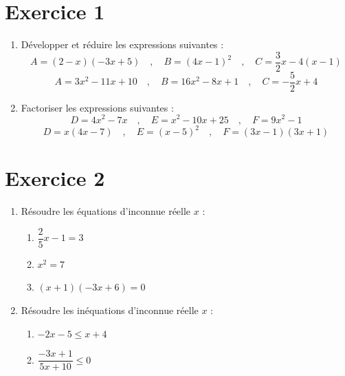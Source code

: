 \documentclass[12pt]{article}
\begin{document}
\section*{Exercice 1}

\begin{enumerate}
    \item Développer et réduire les expressions suivantes :
    \[
    A = (2 - x)(-3x + 5) \quad , \quad B = (4x - 1)^2 \quad , \quad C = \dfrac{3}{2}x - 4(x - 1)
    \]
    {\color{red}
    \[
    A = \boxed{3x^2 - 11x + 10} \quad , \quad B = \boxed{16x^2 - 8x + 1} \quad , \quad C = \boxed{-\dfrac{5}{2}x + 4}
    \]}

    \item Factoriser les expressions suivantes :
    \[
    D = 4x^2 - 7x \quad , \quad E = x^2 - 10x + 25 \quad , \quad F = 9x^2 - 1
    \]
    {\color{red}
    \[
    D = \boxed{x(4x - 7)} \quad , \quad E = \boxed{(x - 5)^2} \quad , \quad F = \boxed{(3x - 1)(3x + 1)}
    \]}
\end{enumerate}

\section*{Exercice 2}

\begin{enumerate}
    \item Résoudre les équations d'inconnue réelle $x$ :

    \begin{enumerate}
        \item $\dfrac{2}{5}x - 1 = 3$
        {\color{red} }

        \item $x^2 = 7$
        {\color{red} }

        \item $(x + 1)(-3x + 6) = 0$
        {\color{red} }
    \end{enumerate}

    \item Résoudre les inéquations d'inconnue réelle $x$ :

    \begin{enumerate}
        \item $-2x - 5 \leq x + 4$
        {\color{red} \boxed{x \geq -3 \hspace{1cm} S=[-3;+\infty[}}

        \item $\dfrac{-3x + 1}{5x + 10} \leq 0$
        {\color{red} \boxed{x \in \left]-\infty; -2\right[ \cup \left[\dfrac{1}{3}; +\infty\right[}}
    \end{enumerate}
\end{enumerate}
\end{document}
